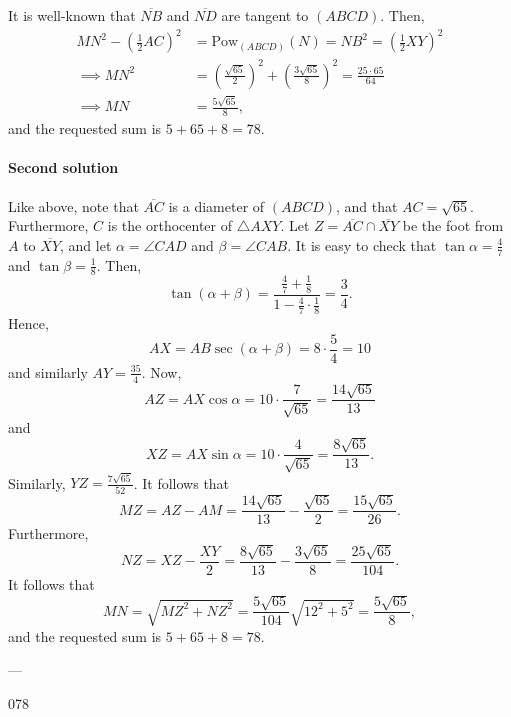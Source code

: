 It is well-known that $\overline{NB}$ and $\overline{ND}$ are tangent to $(ABCD)$. Then,
\begin{align*}
    MN^2-\left(\frac12AC\right)^2&=\text{Pow}_{(ABCD)}(N)=NB^2=\left(\frac12XY\right)^2\\
    \implies MN^2&=\left(\frac{\sqrt{65}}2\right)^2+\left(\frac{3\sqrt{65}}8\right)^2=\frac{25\cdot 65}{64}\\
    \implies MN&=\frac{5\sqrt{65}}8,
\end{align*}
and the requested sum is $5+65+8=78$.

\paragraph{Second solution}     Like above, note that $\overline{AC}$ is a diameter of $(ABCD)$, and that $AC=\sqrt{65}$. Furthermore, $C$ is the orthocenter of $\triangle AXY$. Let $Z=\overline{AC}\cap\overline{XY}$ be the foot from $A$ to $\overline{XY}$, and let $\alpha=\angle CAD$ and $\beta=\angle CAB$. It is easy to check that $\tan\alpha=\tfrac47$ and $\tan\beta=\tfrac18$. Then, \[\tan(\alpha+\beta)=\frac{\tfrac47+\tfrac18}{1-\tfrac47\cdot\tfrac18}=\frac34.\]
Hence, \[AX=AB\sec(\alpha+\beta)=8\cdot\frac54=10\]
and similarly $AY=\frac{35}4$. Now, \[AZ=AX\cos\alpha=10\cdot\frac7{\sqrt{65}}=\frac{14\sqrt{65}}{13}\]
and \[XZ=AX\sin\alpha=10\cdot\frac4{\sqrt{65}}=\frac{8\sqrt{65}}{13}.\]
Similarly, $YZ=\tfrac{7\sqrt{65}}{52}$. It follows that \[MZ=AZ-AM=\frac{14\sqrt{65}}{13}-\frac{\sqrt{65}}2=\frac{15\sqrt{65}}{26}.\]
Furthermore, \[NZ=XZ-\frac{XY}2=\frac{8\sqrt{65}}{13}-\frac{3\sqrt{65}}8=\frac{25\sqrt{65}}{104}.\]
It follows that \[MN=\sqrt{MZ^2+NZ^2}=\frac{5\sqrt{65}}{104}\sqrt{12^2+5^2}=\frac{5\sqrt{65}}8,\]
and the requested sum is $5+65+8=78$.


---

078
